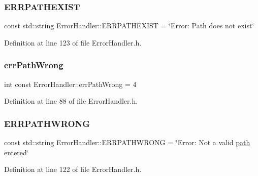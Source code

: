 \subsubsection{\texorpdfstring{ERRPATHEXIST}{ERRPATHEXIST}}
{\footnotesize\ttfamily const std\+::string Error\+Handler\+::\+E\+R\+R\+P\+A\+T\+H\+E\+X\+I\+ST = \char`\"{}Error\+: Path does not exist\char`\"{}\hspace{0.3cm}{\ttfamily [static]}}



Definition at line 123 of file Error\+Handler.\+h.

\mbox{\label{classErrorHandler_aa25a9f5aef3ad844325d5fb3e0fa444d}} 
\subsubsection{\texorpdfstring{errPathWrong}{errPathWrong}}
{\footnotesize\ttfamily int const Error\+Handler\+::err\+Path\+Wrong = 4\hspace{0.3cm}{\ttfamily [static]}}



Definition at line 88 of file Error\+Handler.\+h.

\mbox{\label{classErrorHandler_aaab6de85cae710a56ae6324b06a42179}} 
\subsubsection{\texorpdfstring{ERRPATHWRONG}{ERRPATHWRONG}}
{\footnotesize\ttfamily const std\+::string Error\+Handler\+::\+E\+R\+R\+P\+A\+T\+H\+W\+R\+O\+NG = \char`\"{}Error\+: Not a valid \mbox{\hyperlink{classErrorHandler_aeabbc987b7eaa01b6d006b55b4e00574}{path}} entered\char`\"{}\hspace{0.3cm}{\ttfamily [static]}}



Definition at line 122 of file Error\+Handler.\+h.

\mbox{\label{classErrorHandler_a737a712190c5e9dcbd11230bd3c2eaca}} 
